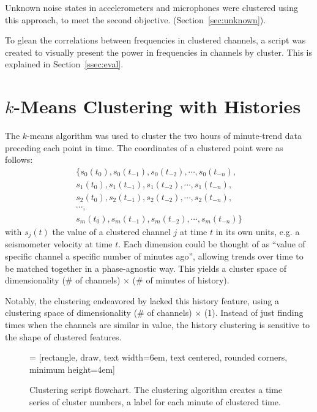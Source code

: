\documentclass[colorlinks=true,pdfstartview=FitV,linkcolor=blue,
            citecolor=red,urlcolor=magenta]{ligodoc}
\begin{document}
Unknown noise states in accelerometers and microphones were clustered using this approach, to meet the second objective. (Section~\ref{sec:unknown}).

To glean the correlations between frequencies in clustered channels, a script was created to visually present the power in frequencies in channels by cluster. This is explained in Section~\ref{ssec:eval}.

\section{$k$-Means Clustering with Histories}\label{sec:kmeans}
The $k$-means algorithm was used to cluster the two hours of minute-trend data preceding each point in time.
The coordinates of a clustered point were as follows:
\begin{equation}
  \begin{array}{c}
    \{s_0(t_0),s_0(t_{-1}),s_0(t_{-2}),\cdots,s_0(t_{-n}),\\
    s_1(t_0),s_1(t_{-1}),s_1(t_{-2}),\cdots,s_1(t_{-n}),\\
    s_2(t_0),s_2(t_{-1}),s_2(t_{-2}),\cdots,s_2(t_{-n}),\\
    \cdots,\\
    s_m(t_0),s_m(t_{-1}),s_m(t_{-2}),\cdots,s_m(t_{-n})\}
  \end{array}
\end{equation}
with $s_j(t)$ the value of a clustered channel $j$ at time $t$ in its own units, e.g. a seismometer velocity at time $t$.
Each dimension could be thought of as ``value of specific channel a specific number of minutes ago'', allowing trends over time to be matched together in a phase-agnostic way.
This yields a cluster space of dimensionality (\# of channels) $\times$ (\# of minutes of history).

Notably, the clustering endeavored by \cite{roxana} lacked this history feature, using a clustering space of dimensionality (\# of channels) $\times$ (1).
Instead of just finding times when the channels are similar in value, the history clustering is sensitive to the shape of clustered features.

\begin{figure}[h]
   = [rectangle, draw, text width=6em, text centered, rounded corners, minimum height=4em]
  \caption{Clustering script flowchart. The clustering algorithm creates a time series of cluster numbers, a label for each minute of clustered time.}
\end{figure}
\end{document}
